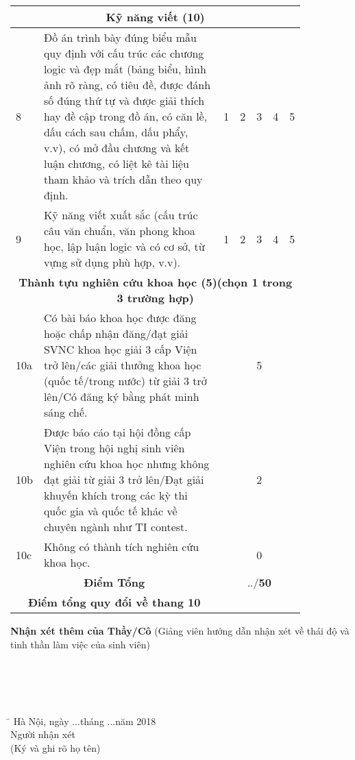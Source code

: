 \begin{longtable}{| m{0.035\linewidth} | m{0.7\linewidth} | m{0.02\linewidth} | m{0.02\linewidth}| m{0.02\linewidth}|  m{0.02\linewidth} | m{0.02\linewidth} |}
	\multicolumn{7}{|c|}{\textbf{Kỹ năng viết (10)}} \\ \hline
	8 & Đồ án trình bày đúng biểu mẫu quy định với cấu trúc các chương logic và đẹp mắt (bảng biểu, hình ảnh rõ ràng, có tiêu đề, được đánh số đúng thứ tự và được giải thích hay đề cập trong đồ án, có căn lề, dấu cách sau chấm, dấu phẩy, v.v), có mở đầu chương và kết luận chương, có liệt kê tài liệu tham khảo và trích dẫn theo quy định. & 1 & 2 & 3 & 4 & 5 \\ \hline
    9 & Kỹ năng viết xuất sắc (cấu trúc câu văn chuẩn, văn phong khoa học, lập luận logic và có cơ sở, từ vựng sử dụng phù hợp, v.v). & 1 & 2 & 3 & 4 & 5 \\ \hline   
    \multicolumn{7}{|c|}{\textbf{Thành tựu nghiên cứu khoa học (5)(chọn 1 trong 3 trường hợp)}} \\ \hline
	10a & Có bài báo khoa học được đăng hoặc chấp nhận đăng/đạt giải SVNC khoa học giải 3 cấp Viện trở lên/các giải thưởng khoa học (quốc tế/trong nước) từ giải 3 trở lên/Có đăng ký bằng phát minh sáng chế. & \multicolumn{5}{c|}{5} \\ \hline
    10b & Được báo cáo tại hội đồng cấp Viện trong hội nghị sinh viên nghiên cứu khoa học nhưng không đạt giải từ giải 3 trở lên/Đạt giải khuyến khích trong các kỳ thi quốc gia và quốc tế khác về chuyên ngành như TI contest. & \multicolumn{5}{c|}{2} \\ \hline 
    10c & Không có thành tích nghiên cứu khoa học. & \multicolumn{5}{c|}{0} \\ \hline 
    \multicolumn{2}{|c|}{\textbf{Điểm Tổng}} & \multicolumn{5}{c|}{../\textbf{50}} \\ \hline
    \multicolumn{2}{|c|}{\textbf{Điểm tổng quy đổi về thang 10 }} & \multicolumn{5}{c|}{} \\ \hline
	\end{longtable}    
\thispagestyle{plain}
\noindent\textbf{Nhận xét thêm của Thầy/Cô} (Giảng viên hướng dẫn nhận xét về thái độ và tinh thần làm việc của sinh viên) \\
\dotline[4pt]{\linewidth} \\
 \dotline[4pt]{\linewidth}\\
  \dotline[4pt]{\linewidth} \\
   \dotline[4pt]{\linewidth} \\
    \dotline[4pt]{\linewidth}
 
 \begin{tabbing}
 \hspace{9cm}\=\kill
   \> Hà Nội, ngày ...tháng ...năm 2018 \\ 
   \>  \hspace{1.5cm}    Người nhận xét\\ 
   \>   \hspace{1cm}  (Ký và ghi rõ họ tên)		
 \end{tabbing} 

